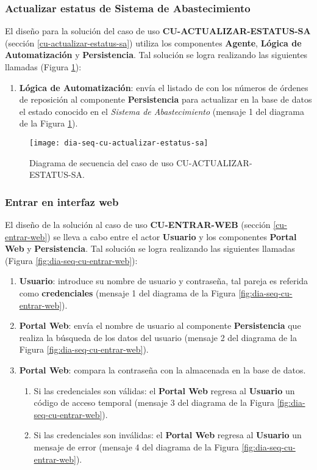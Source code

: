 \subsubsection{Actualizar estatus de Sistema de Abastecimiento}
El diseño para la solución del caso de uso \textbf{CU-ACTUALIZAR-ESTATUS-SA} (sección \ref{cu-actualizar-estatus-sa}) utiliza los componentes \textbf{Agente}, \textbf{Lógica de Automatización} y \textbf{Persistencia}. Tal solución se logra realizando las siguientes llamadas (Figura \ref{fig:dia-seq-cu-actualizar-estatus-sa}):
\begin{enumerate}
	\item \textbf{Lógica de Automatización}: envía el listado de con los números de órdenes de reposición al componente \textbf{Persistencia} para actualizar en la base de datos el estado conocido en el \textit{Sistema de Abastecimiento} (mensaje 1 del diagrama de la Figura \ref{fig:dia-seq-cu-actualizar-estatus-sa}).
\end{enumerate}

\begin{figure}[h]
	\centering
	\texttt{[image: dia-seq-cu-actualizar-estatus-sa]}
	\caption{Diagrama de secuencia del caso de uso CU-ACTUALIZAR-ESTATUS-SA.}
	\label{fig:dia-seq-cu-actualizar-estatus-sa}
\end{figure}

\subsubsection{Entrar en interfaz web}
El diseño de la solución al caso de uso \textbf{CU-ENTRAR-WEB} (sección \ref{cu-entrar-web}) se lleva a cabo entre el actor \textbf{Usuario} y los componentes \textbf{Portal Web} y \textbf{Persistencia}. Tal solución se logra realizando las siguientes llamadas (Figura \ref{fig:dia-seq-cu-entrar-web}):
\begin{enumerate}
	\item \textbf{Usuario}: introduce su nombre de usuario y contraseña, tal pareja es referida como \textbf{credenciales} (mensaje 1 del diagrama de la Figura \ref{fig:dia-seq-cu-entrar-web}).
	\item \textbf{Portal Web}: envía el nombre de usuario al componente \textbf{Persistencia} que realiza la búsqueda de los datos del usuario (mensaje 2 del diagrama de la Figura \ref{fig:dia-seq-cu-entrar-web}).
	\item \textbf{Portal Web}: compara la contraseña con la almacenada en la base de datos.
	\begin{enumerate}
		\item Si las credenciales son válidas: el \textbf{Portal Web} regresa al \textbf{Usuario} un código de acceso temporal (mensaje 3 del diagrama de la Figura \ref{fig:dia-seq-cu-entrar-web}).
		\item Si las credenciales son inválidas: el \textbf{Portal Web} regresa al \textbf{Usuario} un mensaje de error (mensaje 4 del diagrama de la Figura \ref{fig:dia-seq-cu-entrar-web}).
	\end{enumerate}
\end{enumerate}

